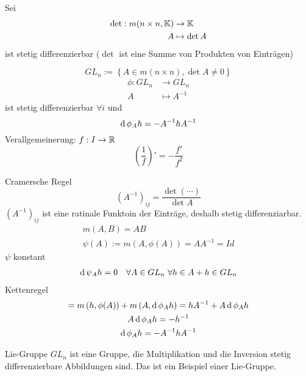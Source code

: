 \begin{Def}
  Sei 
  \begin{align*}
    \det:m(n\times n,\mathbb{K})&\to\mathbb{K}\\
    A&\mapsto \det A
  \end{align*}
  ist stetig differenzierbar ($\det$ ist eine Summe von Produkten von Einträgen)
\end{Def}
\begin{Kor}
  \[GL_n:=\left\{ A\in m(n\times n),\det A\neq 0 \right\}\]
  \begin{align*}
    \phi:GL_n&\to GL_n\\
    A&\mapsto A^{-1}
  \end{align*}
  ist stetig differenzierbar $\forall i$ und
  \[\operatorname{d} \phi_A h=-A^{-1}hA^{-1}\] %
  Verallgemeinerung: $f:I\to\mathbb{R}$
  \[\left( \frac{1}{f} \right)'=-\frac{f'}{f^2}\]
\end{Kor}
\begin{Bew}
  Cramersche Regel
  \[\left( A^{-1} \right)_{ij}=\frac{\det\left( \cdots \right)}{\det A}\]
  $\left( A^{-1} \right)_{ij}$ ist eine ratinale Funktoin der Einträge, deshalb stetig differenziarbar.
  \begin{gather*}
    m(A,B)=AB\\
    \psi(A):=m\left( A,\phi(A) \right)=AA^{-1}=Id
  \end{gather*}
  $\psi$ konstant
  \begin{align*}
    \operatorname{d} \psi_Ah=0&&\forall A\in GL_n\ \forall h\in A+h\in GL_n
  \end{align*}
  Kettenregel
  \begin{gather*}
    =m\left( h,\phi(A) \right)+m\left( A,\operatorname{d} \phi_Ah \right)=hA^{-1}+A\operatorname{d} \phi_Ah\\
    A\operatorname{d} \phi_Ah=-h^{-1}\\
    \operatorname{d} \phi_Ah=-A^{-1}hA^{-1}
  \end{gather*}
\end{Bew}
\begin{Bem}{Lie-Gruppe}
  $GL_n$ ist eine Gruppe, die Multiplikation und die Inversion stetig differenzierbare Abbildungen sind. Das ist ein Beispiel einer Lie-Gruppe.
\end{Bem}
